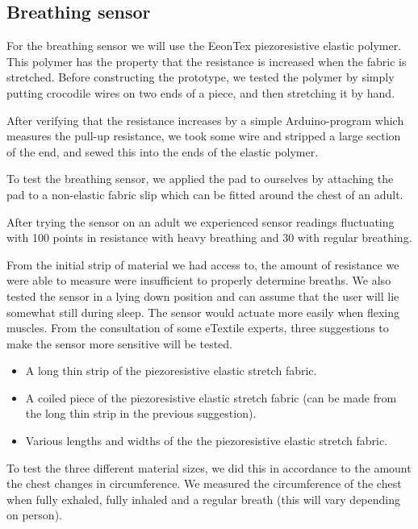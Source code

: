 \documentclass{sigchi-ext}
\begin{document}
\subsection{Breathing sensor}
For the breathing sensor we will use the EeonTex piezoresistive elastic polymer.
This polymer has the property that the resistance is increased when the fabric
is stretched.
Before constructing the prototype, we tested the polymer by simply putting
crocodile wires on two ends of a piece, and then stretching it by hand.

After verifying that the resistance increases by a simple Arduino-program which
measures the pull-up resistance, we took some wire and stripped a large section
of the end, and sewed this into the ends of the elastic polymer.

To test the breathing sensor, we applied the pad to ourselves by attaching the pad to a
non-elastic fabric slip which can be fitted around the chest of an adult.

After trying the sensor on an adult we experienced sensor readings fluctuating
with 100 points in resistance with heavy breathing and 30 with regular breathing.

From the initial strip of material we had access to, the 
amount of resistance we were able to measure were 
insufficient to properly determine breaths. We also tested
the sensor in a lying down position and can assume
that the user will lie somewhat still during sleep. The
sensor would actuate more easily when flexing muscles. 
From the consultation of some eTextile experts, three 
suggestions to make the sensor more sensitive will
be tested.

\begin{itemize}
  \item A long thin strip of the piezoresistive elastic
  stretch fabric.
  \item A coiled piece of the piezoresistive elastic
  stretch fabric (can be made from the long thin strip in
  the previous suggestion).
  \item Various lengths and widths of the the piezoresistive
  elastic stretch fabric.
\end{itemize}

To test the three different material sizes, we did this in accordance to the amount the chest changes in circumference. We measured the circumference of the chest when fully
exhaled, fully inhaled and a regular breath (this will vary depending on person).
\end{document}
